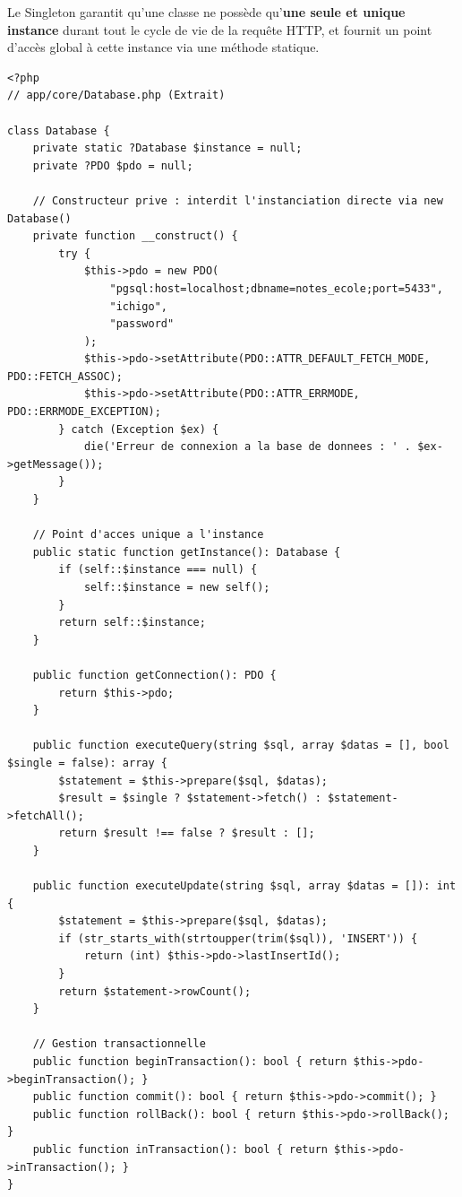 \documentclass[11pt,a4paper,oneside]{report}
\begin{document}
\begin{conceptBox}
Le Singleton garantit qu'une classe ne possède qu'\textbf{une seule et unique instance} durant tout le cycle de vie de la requête HTTP, et fournit un point d'accès global à cette instance via une méthode statique.
\end{conceptBox}

\begin{lstlisting}[language=PHP8, caption={Implémentation complète du Singleton Database}]
<?php
// app/core/Database.php (Extrait)

class Database {
    private static ?Database $instance = null;
    private ?PDO $pdo = null;

    // Constructeur prive : interdit l'instanciation directe via new Database()
    private function __construct() {
        try {
            $this->pdo = new PDO(
                "pgsql:host=localhost;dbname=notes_ecole;port=5433",
                "ichigo",
                "password"
            );
            $this->pdo->setAttribute(PDO::ATTR_DEFAULT_FETCH_MODE, PDO::FETCH_ASSOC);
            $this->pdo->setAttribute(PDO::ATTR_ERRMODE, PDO::ERRMODE_EXCEPTION);
        } catch (Exception $ex) {
            die('Erreur de connexion a la base de donnees : ' . $ex->getMessage());
        }
    }

    // Point d'acces unique a l'instance
    public static function getInstance(): Database {
        if (self::$instance === null) {
            self::$instance = new self();
        }
        return self::$instance;
    }

    public function getConnection(): PDO {
        return $this->pdo;
    }

    public function executeQuery(string $sql, array $datas = [], bool $single = false): array {
        $statement = $this->prepare($sql, $datas);
        $result = $single ? $statement->fetch() : $statement->fetchAll();
        return $result !== false ? $result : [];
    }

    public function executeUpdate(string $sql, array $datas = []): int {
        $statement = $this->prepare($sql, $datas);
        if (str_starts_with(strtoupper(trim($sql)), 'INSERT')) {
            return (int) $this->pdo->lastInsertId();
        }
        return $statement->rowCount();
    }

    // Gestion transactionnelle
    public function beginTransaction(): bool { return $this->pdo->beginTransaction(); }
    public function commit(): bool { return $this->pdo->commit(); }
    public function rollBack(): bool { return $this->pdo->rollBack(); }
    public function inTransaction(): bool { return $this->pdo->inTransaction(); }
}
\end{lstlisting}
\end{document}
